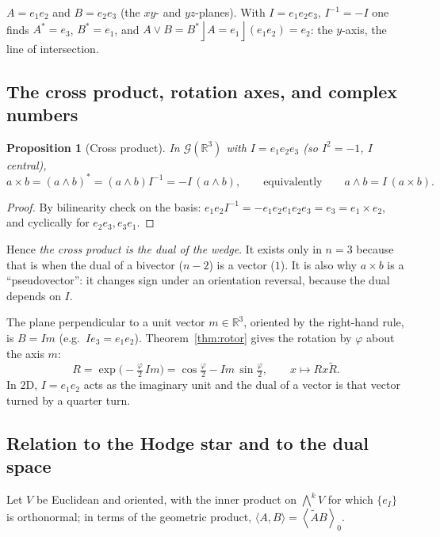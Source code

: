 \documentclass[11pt,a4paper]{article}
\newcounter{thm}[section]
\numberwithin{equation}{section}
\theoremstyle{definition}
\theoremstyle{plain}
\newtheorem{proposition}[thm]{Proposition}
\newcommand{\R}{\mathbb{R}}
\newcommand{\GA}{\mathcal{G}}
\newcommand{\gr}[2]{\left\langle #1 \right\rangle_{#2}}
\newcommand{\rev}[1]{\widetilde{#1}}
\newcommand{\lc}{\mathbin{\rfloor}}
\newcommand{\pss}{I}
\newcommand{\dual}[1]{#1^{\ast}}
\newcommand{\meet}{\vee}
\begin{document}
\begin{example}[Meet of two planes in $\R^3$]
$A=e_1e_2$ and $B=e_2e_3$ (the $xy$- and $yz$-planes). With $\pss=e_1e_2e_3$, $\pss^{-1}=-\pss$ one finds $\dual A=e_3$, $\dual B=e_1$, and $A\meet B=\dual B\lc A=e_1\lc(e_1e_2)=e_2$: the $y$-axis, the line of intersection.
\end{example}

\subsection{The cross product, rotation axes, and complex numbers}

\begin{proposition}[Cross product]\label{prop:cross}
In $\GA(\R^3)$ with $\pss=e_1e_2e_3$ (so $\pss^2=-1$, $\pss$ central),
\[
 a\times b=\dual{(a\wedge b)}=(a\wedge b)\pss^{-1}=-\pss\,(a\wedge b),\qquad\text{equivalently}\qquad a\wedge b=\pss\,(a\times b).
\]
\end{proposition}
\begin{proof}
By bilinearity check on the basis: $e_1e_2\pss^{-1}=-e_1e_2e_1e_2e_3=e_3=e_1\times e_2$, and cyclically for $e_2e_3,e_3e_1$.
\end{proof}

Hence \emph{the cross product is the dual of the wedge}. It exists only in $n=3$ because that is when the dual of a bivector ($n-2$) is a vector ($1$). It is also why $a\times b$ is a ``pseudovector'': it changes sign under an orientation reversal, because the dual depends on $\pss$.

\begin{example}
The plane perpendicular to a unit vector $m\in\R^3$, oriented by the right-hand rule, is $B=\pss m$ (e.g.\ $\pss e_3=e_1e_2$). Theorem~\ref{thm:rotor} gives the rotation by $\varphi$ about the axis $m$:
\[
 R=\exp\!\bigl(-\tfrac\varphi2\,\pss m\bigr)=\cos\tfrac\varphi2-\pss m\,\sin\tfrac\varphi2,\qquad x\mapsto Rx\rev R .
\]
In $2$D, $\pss=e_1e_2$ acts as the imaginary unit and the dual of a vector is that vector turned by a quarter turn.
\end{example}

\subsection{Relation to the Hodge star and to the dual space}

Let $V$ be Euclidean and oriented, with the inner product on $\bigwedge^kV$ for which $\{e_I\}$ is orthonormal; in terms of the geometric product, $\langle A,B\rangle=\gr{\rev AB}{0}$.
\end{document}
